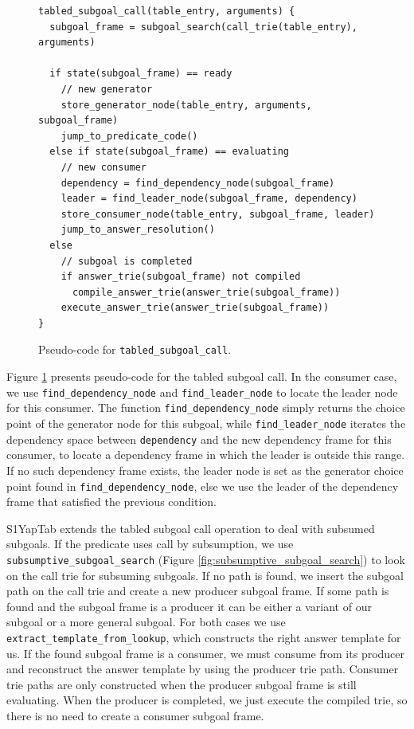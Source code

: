 \begin{figure}[ht]
\begin{Verbatim}
tabled_subgoal_call(table_entry, arguments) {
  subgoal_frame = subgoal_search(call_trie(table_entry), arguments)
  
  if state(subgoal_frame) == ready
    // new generator
    store_generator_node(table_entry, arguments, subgoal_frame)
    jump_to_predicate_code()
  else if state(subgoal_frame) == evaluating
    // new consumer
    dependency = find_dependency_node(subgoal_frame)
    leader = find_leader_node(subgoal_frame, dependency)
    store_consumer_node(table_entry, subgoal_frame, leader)
    jump_to_answer_resolution()
  else
    // subgoal is completed
    if answer_trie(subgoal_frame) not compiled
      compile_answer_trie(answer_trie(subgoal_frame))
    execute_answer_trie(answer_trie(subgoal_frame))
}
\end{Verbatim}
\caption{Pseudo-code for \texttt{tabled\_subgoal\_call}.}
\label{fig:tabled_subgoal_call}
\end{figure}

Figure \ref{fig:tabled_subgoal_call} presents pseudo-code for the tabled subgoal call.
In the consumer case, we use \texttt{find\_dependency\_node} and \texttt{find\_leader\_node}
to locate the leader node for this consumer. The function \texttt{find\_dependency\_node} simply
returns the choice point of the generator node for this subgoal, while \texttt{find\_leader\_node}
iterates the dependency space between \texttt{dependency} and the new dependency frame for this consumer,
to locate a dependency frame in which the leader is outside this range. If no such dependency frame
exists, the leader node is set as the generator choice point found in \texttt{find\_dependency\_node},
else we use the leader of the dependency frame that satisfied the previous condition. 

S1YapTab extends the tabled subgoal call operation to deal with subsumed subgoals.
If the predicate uses call by subsumption, we use \texttt{subsumptive\_subgoal\_search}
(Figure \ref{fig:subsumptive_subgoal_search}) to look on the call trie for subsuming subgoals.
If no path is found, we insert the subgoal path on the call trie and create a new producer
subgoal frame. If some path is found and the subgoal frame is a producer it can be either
a variant of our subgoal or a more general subgoal. For both cases
we use \texttt{extract\_template\_from\_lookup}, which constructs the right answer template for us.
If the found subgoal frame is a consumer, we must consume from its producer and reconstruct the answer
template by using the producer trie path.
Consumer trie paths are only constructed when the producer subgoal frame is still evaluating.
When the producer is completed, we just execute the compiled trie, so there is no need
to create a consumer subgoal frame.

